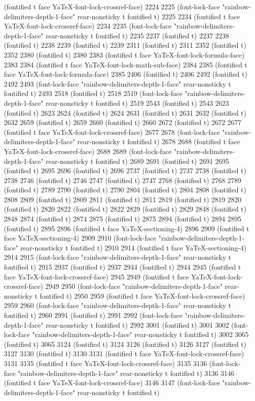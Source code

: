 (fontified t face YaTeX-font-lock-crossref-face) 2224 2225 (font-lock-face "rainbow-delimiters-depth-1-face" rear-nonsticky t fontified t) 2225 2234 (fontified t face YaTeX-font-lock-crossref-face) 2234 2235 (font-lock-face "rainbow-delimiters-depth-1-face" rear-nonsticky t fontified t) 2235 2237 (fontified t) 2237 2238 (fontified t) 2238 2239 (fontified t) 2239 2311 (fontified t) 2311 2352 (fontified t) 2352 2380 (fontified t) 2380 2383 (fontified t face YaTeX-font-lock-formula-face) 2383 2384 (fontified t face YaTeX-font-lock-math-sub-face) 2384 2385 (fontified t face YaTeX-font-lock-formula-face) 2385 2406 (fontified t) 2406 2492 (fontified t) 2492 2493 (font-lock-face "rainbow-delimiters-depth-1-face" rear-nonsticky t fontified t) 2493 2518 (fontified t) 2518 2519 (font-lock-face "rainbow-delimiters-depth-1-face" rear-nonsticky t fontified t) 2519 2543 (fontified t) 2543 2623 (fontified t) 2623 2624 (fontified t) 2624 2631 (fontified t) 2631 2632 (fontified t) 2632 2659 (fontified t) 2659 2660 (fontified t) 2660 2672 (fontified t) 2672 2677 (fontified t face YaTeX-font-lock-crossref-face) 2677 2678 (font-lock-face "rainbow-delimiters-depth-1-face" rear-nonsticky t fontified t) 2678 2688 (fontified t face YaTeX-font-lock-crossref-face) 2688 2689 (font-lock-face "rainbow-delimiters-depth-1-face" rear-nonsticky t fontified t) 2689 2691 (fontified t) 2691 2695 (fontified t) 2695 2696 (fontified t) 2696 2737 (fontified t) 2737 2738 (fontified t) 2738 2746 (fontified t) 2746 2747 (fontified t) 2747 2768 (fontified t) 2768 2789 (fontified t) 2789 2790 (fontified t) 2790 2804 (fontified t) 2804 2808 (fontified t) 2808 2809 (fontified t) 2809 2811 (fontified t) 2811 2819 (fontified t) 2819 2820 (fontified t) 2820 2822 (fontified t) 2822 2829 (fontified t) 2829 2848 (fontified t) 2848 2874 (fontified t) 2874 2875 (fontified t) 2875 2894 (fontified t) 2894 2895 (fontified t) 2895 2896 (fontified t face YaTeX-sectioning-4) 2896 2909 (fontified t face YaTeX-sectioning-4) 2909 2910 (font-lock-face "rainbow-delimiters-depth-1-face" rear-nonsticky t fontified t) 2910 2914 (fontified t face YaTeX-sectioning-4) 2914 2915 (font-lock-face "rainbow-delimiters-depth-1-face" rear-nonsticky t fontified t) 2915 2937 (fontified t) 2937 2944 (fontified t) 2944 2945 (fontified t face YaTeX-font-lock-crossref-face) 2945 2949 (fontified t face YaTeX-font-lock-crossref-face) 2949 2950 (font-lock-face "rainbow-delimiters-depth-1-face" rear-nonsticky t fontified t) 2950 2959 (fontified t face YaTeX-font-lock-crossref-face) 2959 2960 (font-lock-face "rainbow-delimiters-depth-1-face" rear-nonsticky t fontified t) 2960 2991 (fontified t) 2991 2992 (font-lock-face "rainbow-delimiters-depth-1-face" rear-nonsticky t fontified t) 2992 3001 (fontified t) 3001 3002 (font-lock-face "rainbow-delimiters-depth-1-face" rear-nonsticky t fontified t) 3002 3065 (fontified t) 3065 3124 (fontified t) 3124 3126 (fontified t) 3126 3127 (fontified t) 3127 3130 (fontified t) 3130 3131 (fontified t face YaTeX-font-lock-crossref-face) 3131 3135 (fontified t face YaTeX-font-lock-crossref-face) 3135 3136 (font-lock-face "rainbow-delimiters-depth-1-face" rear-nonsticky t fontified t) 3136 3146 (fontified t face YaTeX-font-lock-crossref-face) 3146 3147 (font-lock-face "rainbow-delimiters-depth-1-face" rear-nonsticky t fontified t) 